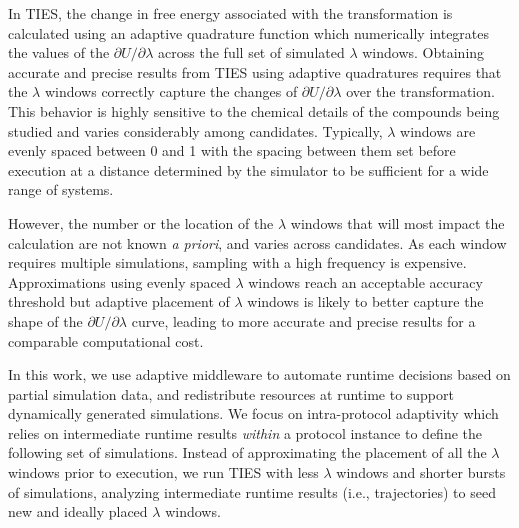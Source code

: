 In TIES, the change in free energy associated with the transformation is
calculated using an adaptive quadrature function which numerically integrates
the values of the $\partial U/\partial\lambda$ across the full set of
simulated $\lambda$ windows. Obtaining accurate and precise results from TIES
using adaptive quadratures requires that the $\lambda$ windows correctly
capture the changes of $\partial U/\partial\lambda$ over the transformation.
This behavior is highly sensitive to the chemical details of the compounds
being studied and varies considerably among candidates. Typically, $\lambda$
windows are evenly spaced between 0 and 1 with the spacing between them set
before execution at a distance determined by the simulator to be sufficient
for a wide range of systems.

However, the number or the location of the $\lambda$ windows that will most
impact the calculation are not known \textit{a priori}, and varies across
candidates. As each window requires multiple simulations, sampling with a
high frequency is expensive. Approximations using evenly spaced $\lambda$
windows reach an acceptable accuracy threshold but adaptive placement of
$\lambda$ windows is likely to better capture the shape of the $\partial
U/\partial\lambda$ curve, leading to more accurate and precise results for a
comparable computational cost.

In this work, we use adaptive middleware to automate runtime decisions based
on partial simulation data, and redistribute resources at runtime to support
dynamically generated simulations. We focus on intra-protocol adaptivity
which relies on intermediate runtime results \textit{within} a protocol
instance to define the following set of simulations. Instead of approximating
the placement of all the $\lambda$ windows prior to execution, we run TIES
with less $\lambda$ windows and shorter bursts of simulations, analyzing
intermediate runtime results (i.e., trajectories) to seed new and ideally
placed $\lambda$ windows.
